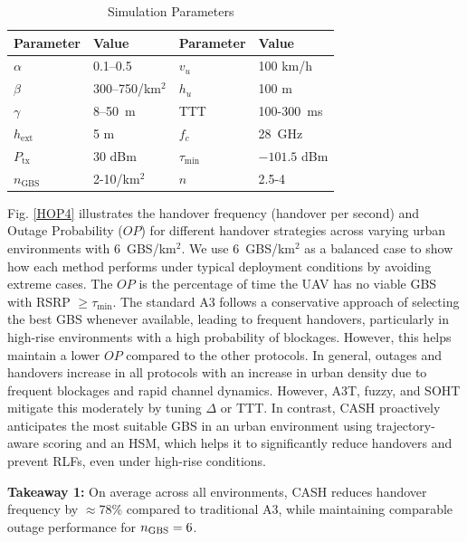 \documentclass[10pt,conference]{IEEEtran}
\begin{document}
\begin{table}[t]
\caption{Simulation Parameters}
\centering
\begin{tabular}{|p{1.5cm}|p{1.5cm}|p{2cm}|p{2cm}|}
\hline
\textbf{Parameter} & \textbf{Value} & \textbf{Parameter} & \textbf{Value} \\
\hline
$\alpha$ & 0.1–0.5 & $v_u$ & 100 km/h \\ \hline
$\beta$ & 300–750/km$^2$ & $h_u$ & 100 m \\ \hline
$\gamma$ & 8–50~m & TTT & 100-300~ms \\ \hline
$h_{\text{ext}}$ & 5 m & $f_c$ & 28~GHz \\ \hline
$P_{\mathrm{tx}}$ & 30 dBm & $\tau_{\min}$ & $-101.5$ dBm \\ \hline
$n_{\text{GBS}}$ & 2-10/km$^2$ & $n$ & 2.5-4 \\ \hline
\end{tabular}
\label{simparams}
\vspace{-.5cm}
\end{table}

Fig. \ref{HOP4} illustrates the handover frequency (handover per second) and Outage Probability ($OP$) for different handover strategies across varying urban environments with 6~GBS/km$^2$. We use 6~GBS/km$^2$ as a balanced case to show how each method performs under typical deployment conditions by avoiding extreme cases.  The $OP$ is the percentage of time the UAV has no viable GBS with RSRP $\geq \tau_{\min}$. The standard A3 follows a conservative approach of selecting the best GBS whenever available, leading to frequent handovers, particularly in high-rise environments with a high probability of blockages. However, this helps maintain a lower $OP$ compared to the other protocols. In general, outages and handovers increase in all protocols with an increase in urban density due to frequent blockages and rapid channel dynamics. However, A3T, fuzzy, and SOHT mitigate this moderately by tuning $\Delta$ or TTT. In contrast, CASH proactively anticipates the most suitable GBS in an urban environment using trajectory-aware scoring and an HSM, which helps it to significantly reduce handovers and prevent RLFs, even under high-rise conditions.

\begin{tcolorbox}[colback=gray!10, colframe=black!30, boxrule=0.4pt, sharp corners, left=2pt, right=2pt, top=2pt, bottom=2pt]
\footnotesize \textbf{Takeaway 1:} On average across all environments, CASH reduces handover frequency by $\approx$78\% compared to traditional A3, while maintaining comparable outage performance for $n_{\rm GBS} = 6$. 
\end{tcolorbox}
\end{document}
